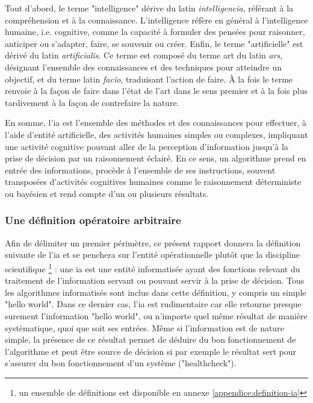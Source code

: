 Tout d'abord, le terme "intelligence" dérive du latin \textit{intelligencia}, référant à la compréhension et à la connaissance. L'intelligence réfère en général à l'intelligence humaine, i.e. cognitive, comme la capacité à formuler des pensées pour raisonner, anticiper ou s'adapter, faire, se souvenir ou créer.
Enfin, le terme "artificielle" est dérivé du latin \textit{artificialis}. Ce terme est composé du terme art du latin \textit{ars}, désignant l'ensemble des connaissances et des techniques pour atteindre un objectif, et du terme latin \textit{facio}, traduisant l'action de faire. À la fois le terme renvoie à la façon de faire dans l'état de l'art dans le sens premier et à la fois plus tardivement à la façon de contrefaire la nature.

En somme, l'\gls{ia} est l'ensemble des méthodes et des connaissances pour effectuer, à l'aide d'entité artificielle, des activités humaines simples ou complexes, impliquant une activité cognitive pouvant aller de la perception d'information jusqu'à la prise de décision par un raisonnement éclairé. En ce sens, un algorithme prend en entrée des informations, procède à l'ensemble de ses instructions, souvent transposées d'activités cognitives humaines comme le raisonnement déterministe ou bayésien et rend compte d'un ou plusieurs résultats.

\subsubsection{Une définition opératoire arbitraire}
Afin de délimiter un premier périmètre, ce présent rapport donnera la définition suivante de l'\gls{ia} et se penchera sur l'entité opérationnelle plutôt que la discipline scientifique \footnote{un ensemble de définitions est disponible en annexe \ref{appendice:definition-ia}} : une \gls{ia} est une entité informatisée ayant des fonctions relevant du traitement de l'information servant ou pouvant servir à la prise de décision. Tous les algorithmes informatisés sont inclus dans cette définition, y compris un simple "hello world". Dans ce dernier cas, l'\gls{ia} est rudimentaire car elle retourne presque surement l'information "hello world", ou n'importe quel même résultat de manière systèmatique, quoi que soit ses entrées. Même si l'information est de nature simple, la présence de ce résultat permet de déduire du bon fonctionnement de l'algorithme et peut être source de décision si par exemple le résultat sert pour s'assurer du bon fonctionnement d'un système ("healthcheck").

